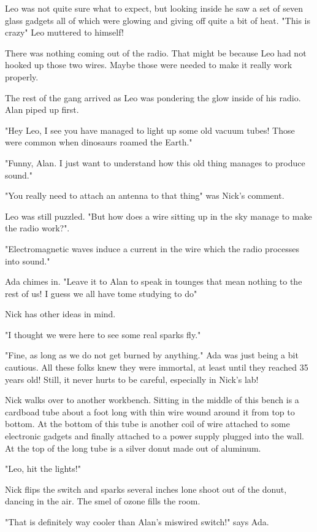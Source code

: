 Leo was not quite sure what to expect, but looking inside he saw a set of seven
glass gadgets all of which were glowing and giving off quite a bit of heat. "This is
crazy" Leo muttered to himself!

There was nothing coming out of the radio. That might be because Leo had not
hooked up those two wires. Maybe those were needed to make it really work
properly.

The rest of the gang arrived as Leo was pondering the glow inside of his radio.
Alan piped up first.

"Hey Leo, I see you have managed to light up some old vacuum tubes! Those were
common when dinosaurs roamed the Earth."

"Funny, Alan. I just want to understand how this old thing manages to produce
sound."

"You really need to attach an antenna to that thing" was Nick's comment. 

Leo was still puzzled. "But how does a wire sitting up in the sky manage to
make the radio work?".

"Electromagnetic waves induce a current in the wire which the radio processes
into sound."

Ada chimes in. "Leave it to Alan to speak in tounges that mean nothing to the
rest of us! I guess we all have tome studying to do"

Nick has other ideas in mind.

"I thought we were here to see some real sparks fly."

"Fine, as long as we do not get burned by anything." Ada was just being a bit
cautious. All these folks knew they were immortal, at least until they reached
35 years old! Still, it never hurts to be careful, especially in Nick's lab!

Nick walks over to another workbench. Sitting in the middle of this bench is a
cardboad tube about a foot long with thin wire wound around it from top to
bottom. At the bottom of this tube is another coil of wire attached to some
electronic gadgets and finally attached to a power supply plugged into the
wall. At the top of the long tube is a silver donut made out of aluminum. 

"Leo, hit the lights!"

Nick flips the switch and sparks several inches lone shoot out of the donut,
dancing in the air. The smel of ozone fills the room.

"That is definitely way cooler than Alan's miswired switch!" says Ada.

